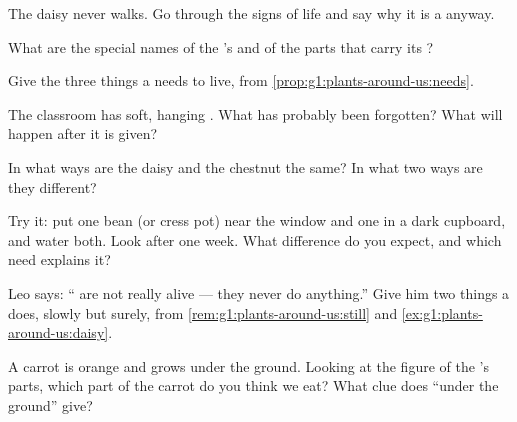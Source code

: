 \begin{exercise}[$\star$]\label{exo:g1:plants-around-us:3}
The daisy never walks. Go through the signs of life and say why it
is a  anyway.
\end{exercise}

\begin{exercise}[$\star$]\label{exo:g1:plants-around-us:4}
What are the special names of the 's  and of the parts that
carry its ?
\end{exercise}

\begin{exercise}[$\star$]\label{exo:g1:plants-around-us:5}
Give the three things a  needs to live, from
\cref{prop:g1:plants-around-us:needs}.
\end{exercise}

\begin{exercise}[$\star$]\label{exo:g1:plants-around-us:6}
The classroom  has soft, hanging . What has probably
been forgotten? What will happen after it is given?
\end{exercise}

\begin{exercise}[$\star$]\label{exo:g1:plants-around-us:7}
In what ways are the daisy and the chestnut  the same? In what
two ways are they different?
\end{exercise}

\begin{exercise}[$\star$]\label{exo:g1:plants-around-us:8}
Try it: put one bean  (or cress pot) near the window and one
in a dark cupboard, and water both. Look after one week. What
difference do you expect, and which need explains it?
\end{exercise}

\begin{exercise}[$\star\star$]\label{exo:g1:plants-around-us:9}
Leo says: `` are not really alive --- they never do
anything.'' Give him two things a  does, slowly but surely,
from \cref{rem:g1:plants-around-us:still} and
\cref{ex:g1:plants-around-us:daisy}.
\end{exercise}

\begin{exercise}[$\star\star$]\label{exo:g1:plants-around-us:10}
A carrot is orange and grows under the ground. Looking at the
figure of the 's parts, which part of the carrot  do you
think we eat? What clue does ``under the ground'' give?
\end{exercise}
